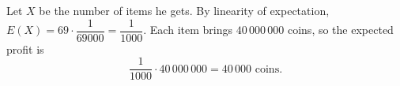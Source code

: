 Let $X$ be the number of items he gets. By linearity of expectation, $E(X)=69\cdot\dfrac{1}{69000}=\dfrac{1}{1000}$. Each item brings $40\,000\,000$ coins, so the expected profit is
\[\dfrac{1}{1000}\cdot40\,000\,000=\boxed{40\,000\text{ coins}}.\]
